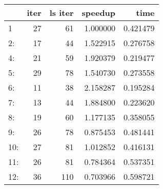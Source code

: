 \begin{tabular}{lrrrr}
\toprule
{} &  iter &  ls iter &   speedup &      time \\
\midrule
1   &    27 &       61 &  1.000000 &  0.421479 \\
2:  &    17 &       44 &  1.522915 &  0.276758 \\
4:  &    21 &       59 &  1.920379 &  0.219477 \\
5:  &    29 &       78 &  1.540730 &  0.273558 \\
6:  &    11 &       38 &  2.158287 &  0.195284 \\
7:  &    13 &       44 &  1.884800 &  0.223620 \\
8:  &    19 &       60 &  1.177135 &  0.358055 \\
9:  &    26 &       78 &  0.875453 &  0.481441 \\
10: &    27 &       81 &  1.012852 &  0.416131 \\
11: &    26 &       81 &  0.784364 &  0.537351 \\
12: &    36 &      110 &  0.703966 &  0.598721 \\
\bottomrule
\end{tabular}
